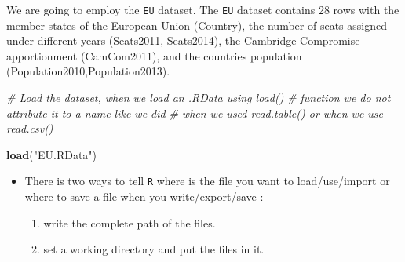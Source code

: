 \documentclass[]{book}
\newenvironment{Shaded}{\begin{snugshade}}{\end{snugshade}}
\newcommand{\KeywordTok}[1]{\textcolor[rgb]{0.13,0.29,0.53}{\textbf{#1}}}
\newcommand{\StringTok}[1]{\textcolor[rgb]{0.31,0.60,0.02}{#1}}
\newcommand{\CommentTok}[1]{\textcolor[rgb]{0.56,0.35,0.01}{\textit{#1}}}
\newcommand{\NormalTok}[1]{#1}
\providecommand{\tightlist}{%
  \setlength{\itemsep}{0pt}\setlength{\parskip}{0pt}}
\newenvironment{rmdblock}[1]
  {\begin{shaded*}
  \begin{itemize}
  \renewcommand{\labelitemi}{
    \raisebox{-.7\height}[0pt][0pt]{
      {\setkeys{Gin}{width=2em,keepaspectratio}\texttt{[image: img/icons/\#1]}}
    }
  }
  \item
  }
  {
  \end{itemize}
  \end{shaded*}
  }
\newenvironment{rmdinsight}
  {\begin{rmdblock}{insight}}
  {\end{rmdblock}}
\begin{document}
We are going to employ the \texttt{EU} dataset. The \texttt{EU} dataset
contains 28 rows with the member states of the European Union (Country),
the number of seats assigned under different years (Seats2011,
Seats2014), the Cambridge Compromise apportionment (CamCom2011), and the
countries population (Population2010,Population2013).

\begin{Shaded}
\begin{Highlighting}[]
\CommentTok{# Load the dataset, when we load an .RData using load()}
\CommentTok{# function we do not attribute it to a name like we did}
\CommentTok{# when we used read.table() or when we use read.csv()}

\KeywordTok{load}\NormalTok{(}\StringTok{"EU.RData"}\NormalTok{)}
\end{Highlighting}
\end{Shaded}

\begin{rmdinsight}
There is two ways to tell \texttt{R} where is the file you want to
load/use/import or where to save a file when you write/export/save :

\begin{enumerate}
\def\labelenumi{\arabic{enumi}.}
\tightlist
\item
  write the complete path of the files.
\item
  set a working directory and put the files in it.
\end{enumerate}
\end{rmdinsight}
\end{document}
